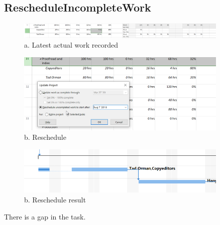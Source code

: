 \documentclass[runningheads]{llncs}
\begin{document}
\subsection*{RescheduleIncompleteWork}
\begin{figure}[H]
    \centering
    \includegraphics[width=0.9\textwidth]{./image/t7f1}
    \caption{a. Latest actual work recorded}
\end{figure}
\begin{figure}[H]
    \centering
    \includegraphics[width=0.9\textwidth]{./image/t7f2}
    \caption{b. Reschedule}
\end{figure}
\begin{figure}[H]
    \centering
    \includegraphics[width=0.9\textwidth]{./image/t7f4}
    \caption{b. Reschedule result}
\end{figure}
There is a gap in the task.
\end{document}
